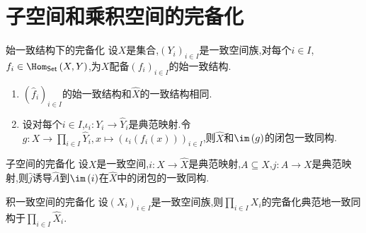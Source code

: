 \section{子空间和乘积空间的完备化}

\begin{proposition}{始一致结构下的完备化}{}
	设$X$是集合,$\left(Y_{i}\right)_{i\in I}$是一致空间族,对每个$i\in I$,$f_{i}\in\Hom_{\mathsf{Set}}\left(X,Y\right)$,为$X$配备$\left(f_{i}\right)_{i\in I}$的始一致结构.
	\begin{enumerate}
		\item $\left(\hat{f}_{i}\right)_{i\in I}$的始一致结构和$\hat{X}$的一致结构相同.
		\item 设对每个$i\in I$,$\iota_{i}:Y_{i}\to\hat{Y}_{i}$是典范映射.令$g:X\to\prod\limits_{i\in I}\hat{Y}_{i},x\mapsto\left(\iota_{i}\left(f_{i}\left(x\right)\right)\right)_{i\in I}$,则$\hat{X}$和$\im\left(g\right)$的闭包一致同构.
	\end{enumerate}
\end{proposition}

\begin{corollary}{子空间的完备化}{}
	设$X$是一致空间,$i:X\to\hat{X}$是典范映射,$A\subseteq X$,$j:A\to X$是典范映射,则$\hat{j}$诱导$\hat{A}$到$\im\left(i\right)$在$\hat{X}$中的闭包的一致同构.
\end{corollary}

\begin{corollary}{积一致空间的完备化}{}
	设$\left(X_{i}\right)_{i\in I}$是一致空间族,则$\prod\limits_{i\in I}X_{i}$的完备化典范地一致同构于$\prod\limits_{i\in I}\hat{X}_{i}$.
\end{corollary}